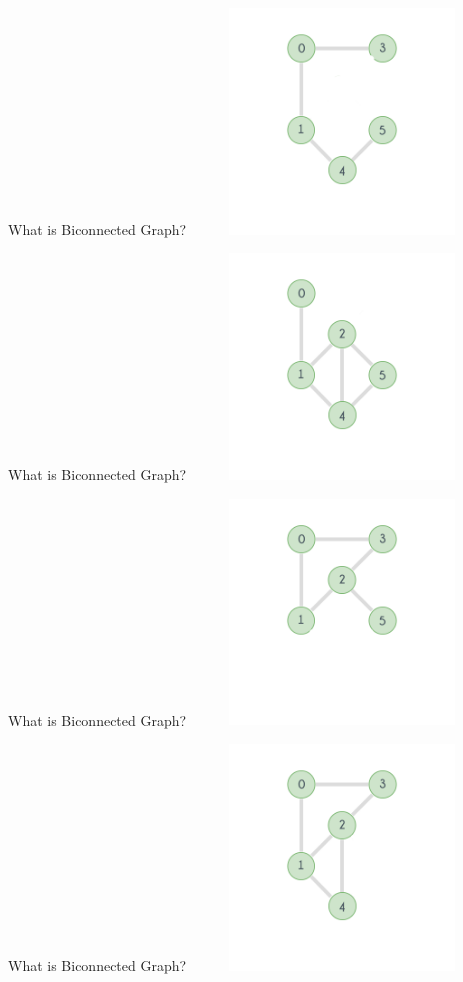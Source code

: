 \documentclass{beamer}
\begin{document}
			\begin{frame}{What is Biconnected Graph?}
				\centering
				\includegraphics[height=6cm,width=8cm]{bic2.png}
			\end{frame}
			\begin{frame}{What is Biconnected Graph?}
				\centering
				\includegraphics[height=6cm,width=8cm]{bic3.png}
			\end{frame}
			\begin{frame}{What is Biconnected Graph?}
				\centering
				\includegraphics[height=6cm,width=8cm]{bic4.png}
			\end{frame}
			\begin{frame}{What is Biconnected Graph?}
				\centering
				\includegraphics[height=6cm,width=8cm]{bic5.png}
			\end{frame}
\end{document}
